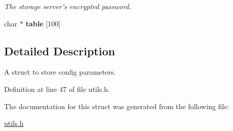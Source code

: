 \begin{DoxyCompactItemize}
\begin{DoxyCompactList}\small\item\em The storage server's encrypted password. \item\end{DoxyCompactList}\item 
\hypertarget{structconfig__params_a7b1933c0c921bb8eec4e74f7a2fda731}{
char $\ast$ {\bfseries table} \mbox{[}100\mbox{]}}
\label{structconfig__params_a7b1933c0c921bb8eec4e74f7a2fda731}

\end{DoxyCompactItemize}


\subsection{Detailed Description}
A struct to store config parameters. 

Definition at line 47 of file utils.h.



The documentation for this struct was generated from the following file:\begin{DoxyCompactItemize}
\item 
\hyperlink{utils_8h}{utils.h}\end{DoxyCompactItemize}

